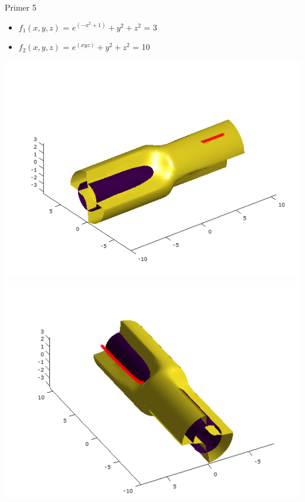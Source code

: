 \documentclass{beamer}
\begin{document}
	\begin{frame}{Primer 5}
		\begin{itemize}  
			\item $f_{1}(x,y,z)$ = $e^{(-x^{2}+1)}+y^{2}+z^{2}$ = 3
			\item $f_{2}(x,y,z)$ = $e^{(xyz)}+y^{2}+z^{2}$ = 10
		\end{itemize} 
		\includegraphics[scale=0.4]{primer5_1}
		\includegraphics[scale=0.4]{primer5_4} 
	\end{frame}
\end{document}
